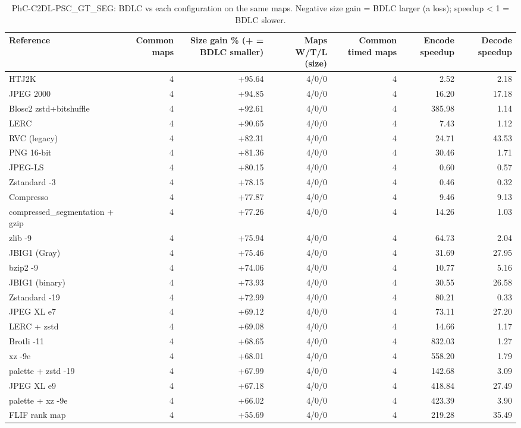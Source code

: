 \begin{table}[t]
\centering
\caption{PhC-C2DL-PSC\_GT\_SEG: BDLC vs each configuration on the same maps. Negative size gain = BDLC larger (a loss); speedup < 1 = BDLC slower.}
\begin{tabular}{lrrrrrr}
\hline
Reference & Common maps & Size gain \% (+ = BDLC smaller) & Maps W/T/L (size) & Common timed maps & Encode speedup & Decode speedup \\
\hline
HTJ2K & 4 & +95.64 & 4/0/0 & 4 & 2.52 & 2.18 \\
JPEG 2000 & 4 & +94.85 & 4/0/0 & 4 & 16.20 & 17.18 \\
Blosc2 zstd+bitshuffle & 4 & +92.61 & 4/0/0 & 4 & 385.98 & 1.14 \\
LERC & 4 & +90.65 & 4/0/0 & 4 & 7.43 & 1.12 \\
RVC (legacy) & 4 & +82.31 & 4/0/0 & 4 & 24.71 & 43.53 \\
PNG 16-bit & 4 & +81.36 & 4/0/0 & 4 & 30.46 & 1.71 \\
JPEG-LS & 4 & +80.15 & 4/0/0 & 4 & 0.60 & 0.57 \\
Zstandard -3 & 4 & +78.15 & 4/0/0 & 4 & 0.46 & 0.32 \\
Compresso & 4 & +77.87 & 4/0/0 & 4 & 9.46 & 9.13 \\
compressed\_segmentation + gzip & 4 & +77.26 & 4/0/0 & 4 & 14.26 & 1.03 \\
zlib -9 & 4 & +75.94 & 4/0/0 & 4 & 64.73 & 2.04 \\
JBIG1 (Gray) & 4 & +75.46 & 4/0/0 & 4 & 31.69 & 27.95 \\
bzip2 -9 & 4 & +74.06 & 4/0/0 & 4 & 10.77 & 5.16 \\
JBIG1 (binary) & 4 & +73.93 & 4/0/0 & 4 & 30.55 & 26.58 \\
Zstandard -19 & 4 & +72.99 & 4/0/0 & 4 & 80.21 & 0.33 \\
JPEG XL e7 & 4 & +69.12 & 4/0/0 & 4 & 73.11 & 27.20 \\
LERC + zstd & 4 & +69.08 & 4/0/0 & 4 & 14.66 & 1.17 \\
Brotli -11 & 4 & +68.65 & 4/0/0 & 4 & 832.03 & 1.27 \\
xz -9e & 4 & +68.01 & 4/0/0 & 4 & 558.20 & 1.79 \\
palette + zstd -19 & 4 & +67.99 & 4/0/0 & 4 & 142.68 & 3.09 \\
JPEG XL e9 & 4 & +67.18 & 4/0/0 & 4 & 418.84 & 27.49 \\
palette + xz -9e & 4 & +66.02 & 4/0/0 & 4 & 423.39 & 3.90 \\
FLIF rank map & 4 & +55.69 & 4/0/0 & 4 & 219.28 & 35.49 \\

\end{tabular}
\end{table}
